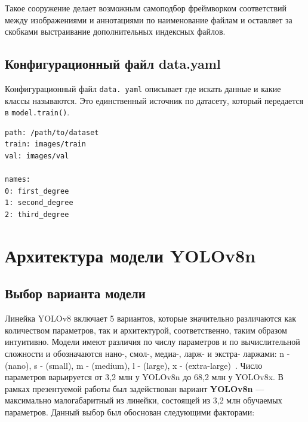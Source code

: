Такое сооружение делает возможным самоподбор фреймворком соответствий между изображениями и аннотациями по наименование файлам и оставляет за скобками выстраивание дополнительных индексных файлов.

\subsection{Конфигурационный файл data.yaml}

Конфигурационный файл \texttt{data. yaml} описывает где искать данные и какие классы называются. Это единственный источник по датасету, который передается в \texttt{model.train()}.

\begin{lstlisting}[caption=Содержимое конфигураторского файла \texttt{data. yaml}, label=lst:yaml]
path: /path/to/dataset
train: images/train
val: images/val

names:
0: first_degree
1: second_degree
2: third_degree
\end{lstlisting}

\section{Архитектура модели YOLOv8n}
\label{sec:model_choice}

\subsection{Выбор варианта модели}

Линейка YOLOv8 включает 5 вариантов, которые значительно различаются как количеством параметров, так и архитектурой, соответственно, таким образом интуитивно. Модели имеют различия по числу параметров и по вычислительной сложности и обозначаются нано-, смол-, медиа-, ларж- и экстра- ларжами: n - (nano), s - (small), m - (medium), l - (large), x - (extra-large)~\cite{ultralytics2023yolov8}. Число параметров варьируется от 3{,}2 млн у YOLOv8n до 68{,}2 млн у YOLOv8x. В рамках презентуемой работы был задействован вариант \textbf{YOLOv8n} --- максимально малогабаритный из линейки, состоящей из 3{,}2 млн обучаемых параметров. Данный выбор был обоснован следующими факторами:

